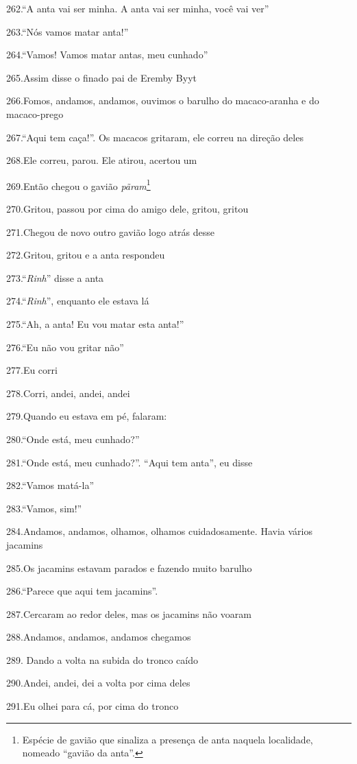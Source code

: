 262.``A anta vai ser minha. A anta vai ser minha, você vai ver''

263.``Nós vamos matar anta!''

264.``Vamos! Vamos matar antas, meu cunhado''

265.Assim disse o finado pai de Eremby Byyt

266.Fomos, andamos, andamos, ouvimos o barulho do macaco-aranha e do
macaco-prego

267.``Aqui tem caça!''. Os macacos gritaram, ele correu na direção deles

268.Ele correu, parou. Ele atirou, acertou um

269.Então chegou o gavião \emph{pãram}\footnote{Espécie de gavião que
  sinaliza a presença de anta naquela localidade, nomeado ``gavião da
  anta''.}

270.Gritou, passou por cima do amigo dele, gritou, gritou

271.Chegou de novo outro gavião logo atrás desse

272.Gritou, gritou e a anta respondeu

273.``\emph{Rinh}'' disse a anta

274.``\emph{Rinh}'', enquanto ele estava lá

275.``Ah, a anta! Eu vou matar esta anta!''

276.``Eu não vou gritar não''

277.Eu corri

278.Corri, andei, andei, andei

279.Quando eu estava em pé, falaram:

280.``Onde está, meu cunhado?''

281.``Onde está, meu cunhado?''. ``Aqui tem anta'', eu disse

282.``Vamos matá-la''

283.``Vamos, sim!''

284.Andamos, andamos, olhamos, olhamos cuidadosamente. Havia vários
jacamins

285.Os jacamins estavam parados e fazendo muito barulho

286.``Parece que aqui tem jacamins''.

287.Cercaram ao redor deles, mas os jacamins não voaram

288.Andamos, andamos, andamos chegamos

289. Dando a volta na subida do tronco caído

290.Andei, andei, dei a volta por cima deles

291.Eu olhei para cá, por cima do tronco

